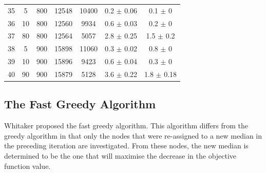 \documentclass[11pt]{article}
\newcommand{\np}{\newpage}
\begin{document}
\begin{table}[]
{\begin{tabular}{ccccccc}
				35 & 5 & 800 & 12548 & 10400 & 0.2 $\pm$ 0.06 & 0.1 $\pm$ 0 \\
				36 & 10 & 800 & 12560 & 9934 & 0.6 $\pm$ 0.03 & 0.2 $\pm$ 0 \\
				37 & 80 & 800 & 12564 & 5057 & 2.8 $\pm$ 0.25 & 1.5 $\pm$ 0.2 \\
				\rowcolor[HTML]{EFEFEF} 
				38 & 5 & 900 & 15898 & 11060 & 0.3 $\pm$ 0.02 & 0.8 $\pm$ 0 \\
				\rowcolor[HTML]{EFEFEF} 
				39 & 10 & 900 & 15896 & 9423 & 0.6 $\pm$ 0.04 & 0.3 $\pm$ 0 \\
				\rowcolor[HTML]{EFEFEF} 
				40 & 90 & 900 & 15879 & 5128 & 3.6 $\pm$ 0.22 & 1.8 $\pm$ 0.18
			\end{tabular}%
		}
	\end{table}
	
	\np
	\subsection{The Fast Greedy Algorithm} \label{fastgreedyalgo}
	Whitaker \cite{WHIT83}  proposed the fast greedy algorithm. This algorithm differs from the greedy algorithm in that only the nodes that were re-assigned to a new median in the preceding iteration are investigated.  From these nodes, the new median is determined to be the one that will maximise the decrease in the objective function value.
	
\end{document}
